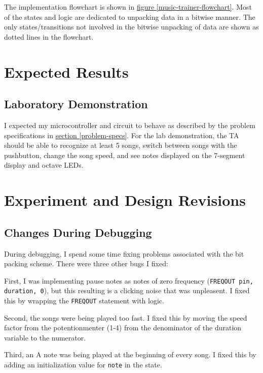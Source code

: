 \documentclass[11pt]{article}
\begin{document}
The implementation flowchart is shown in
\hyperref[music-trainer-flowchart]{figure \ref{music-trainer-flowchart}}.
Most of the states and logic are dedicated to unpacking data in a bitwise
manner. The only states/transitions not involved in the bitwise unpacking
of data are shown as dotted lines in the flowchart.

\section{Expected Results}

\subsection{Laboratory Demonstration}

I expected my microcontroller and circuit to behave as described by the problem specifications in
\hyperref[problem-specs]{section \ref{problem-specs}}.
For the lab demonstration, the TA should be able to recognize at least 5 songs,
switch between songs with the pushbutton, change the song speed, and
see notes displayed on the 7-segment display and octave LEDs.

\section{Experiment and Design Revisions}

\subsection{Changes During Debugging}

During debugging, I spend some time fixing problems associated with the bit packing scheme.
There were three other bugs I fixed:

First, I was implementing pause notes as notes of zero frequency (\texttt{FREQOUT pin, duration, 0}),
but this resulting is a clicking noise that was unpleasent. I fixed this by wrapping the
\texttt{FREQOUT} statement with  logic. 

Second, the songs were being played too fast. I fixed this by moving the speed factor
from the potentionmenter (1-4) from the denominator of the duration variable to the
numerator.

Third, an A note was being played at the beginning of every song. I fixed this by adding
an initialization value for \texttt{note} in the  state.
\end{document}
